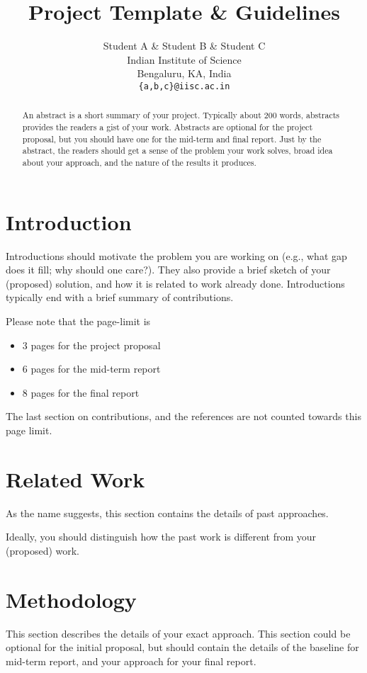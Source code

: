 \documentclass{article} %
\title{Project Template \& Guidelines}
\author{Student A \& Student B \& Student C  \\
Indian Institute of Science \\ 
Bengaluru, KA, India \\
\texttt{\{a,b,c\}@iisc.ac.in} 
}
\begin{document}
\maketitle

\begin{abstract}
An abstract is a short summary of your project. 
Typically about 200 words, abstracts provides the readers 
a gist of your work. 
Abstracts are optional for the project proposal, but 
you should have one for 
the mid-term and final report.
Just by the abstract, the readers should get a sense of 
the problem your work solves, broad idea about your approach, 
and the nature of the results it produces.
\end{abstract}

\section{Introduction}

Introductions should motivate the problem 
you are working on (e.g., what gap does it fill; why should one care?). 
They also provide a brief sketch of your (proposed) solution,
and how it is related to work already done.
Introductions typically end with a brief summary of contributions. 

Please note that the page-limit is 
\begin{itemize}
    \item $3$ pages for the project proposal
    \item $6$ pages for the mid-term report
    \item $8$ pages for the final report
\end{itemize}

The last section on contributions, and the references are not counted towards this page limit.

\section{Related Work}

As the name suggests, this section contains the
details of past approaches. 

Ideally, you should distinguish how the past work is different 
from your (proposed) work.


\section{Methodology}
This section describes the details of your exact approach. 
This section could be optional for the initial proposal, 
but should contain the details 
of the baseline for mid-term report, 
and your approach for your final report. 
\end{document}
